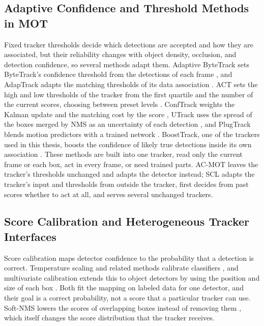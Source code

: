 \subsection{Adaptive Confidence and Threshold Methods in MOT}\label{sec:rw-thresholds}
Fixed tracker thresholds decide which detections are accepted and how they are associated, but their reliability changes with object density, occlusion, and detection confidence, so several methods adapt them. Adaptive ByteTrack sets ByteTrack's confidence threshold from the detections of each frame \cite{ma2023adaptivebytetrack}, and AdapTrack adapts the matching thresholds of its data association \cite{shim2024adaptrack}. ACT sets the high and low thresholds of the tracker from the first quartile and the number of the current scores, choosing between preset levels \cite{act2026adaptive}. ConfTrack weights the Kalman update and the matching cost by the score \cite{jung2024conftrack}, UTrack uses the spread of the boxes merged by NMS as an uncertainty of each detection \cite{solano2025utrack}, and PlugTrack blends motion predictors with a trained network \cite{kim2026plugtrack}. BoostTrack, one of the trackers used in this thesis, boosts the confidence of likely true detections inside its own association \cite{stanojevic2024boosttrack}. These methods are built into one tracker, read only the current frame or each box, act in every frame, or need trained parts. AC-MOT leaves the tracker's thresholds unchanged and adapts the detector instead; SCL adapts the tracker's input and thresholds from outside the tracker, first decides from past scores whether to act at all, and serves several unchanged trackers.

\subsection{Score Calibration and Heterogeneous Tracker Interfaces}\label{sec:rw-calibration}
Score calibration maps detector confidence to the probability that a detection is correct. Temperature scaling and related methods calibrate classifiers \cite{guo2017calibration}, and multivariate calibration extends this to object detectors by using the position and size of each box \cite{kuppers2020detcalib}. Both fit the mapping on labeled data for one detector, and their goal is a correct probability, not a score that a particular tracker can use. Soft-NMS lowers the scores of overlapping boxes instead of removing them \cite{bodla2017softnms}, which itself changes the score distribution that the tracker receives.

